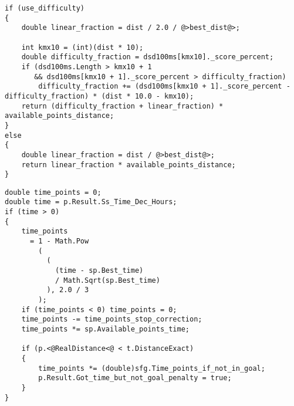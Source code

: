 \documentclass[gap.tex]{subfiles}
\begin{document}
\begin{lstlisting}[style=base, caption={Distance point allocation depends on \textcolor{red}{bonus} distance.}]
if (use_difficulty)
{
    double linear_fraction = dist / 2.0 / @>best_dist@>;

    int kmx10 = (int)(dist * 10);
    double difficulty_fraction = dsd100ms[kmx10]._score_percent;
    if (dsd100ms.Length > kmx10 + 1
       && dsd100ms[kmx10 + 1]._score_percent > difficulty_fraction)
        difficulty_fraction += (dsd100ms[kmx10 + 1]._score_percent - difficulty_fraction) * (dist * 10.0 - kmx10);
    return (difficulty_fraction + linear_fraction) * available_points_distance;
}
else
{
    double linear_fraction = dist / @>best_dist@>;
    return linear_fraction * available_points_distance;
}
\end{lstlisting}

\begin{lstlisting}[style=base, caption={Time point allocation depends on \textcolor{blue}{real} distance.}]
double time_points = 0;
double time = p.Result.Ss_Time_Dec_Hours;
if (time > 0)
{
    time_points
      = 1 - Math.Pow
        (
          (
            (time - sp.Best_time)
            / Math.Sqrt(sp.Best_time)
          ), 2.0 / 3
        );
    if (time_points < 0) time_points = 0;
    time_points -= time_points_stop_correction;
    time_points *= sp.Available_points_time;

    if (p.<@RealDistance<@ < t.DistanceExact)
    {
        time_points *= (double)sfg.Time_points_if_not_in_goal;
        p.Result.Got_time_but_not_goal_penalty = true;
    }
}
\end{lstlisting}
\end{document}
